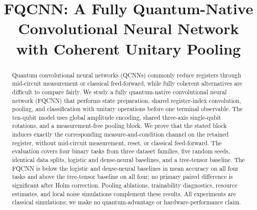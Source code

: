 \documentclass[conference]{IEEEtran}
\begin{document}
\title{FQCNN: A Fully Quantum-Native Convolutional Neural Network with Coherent Unitary Pooling}

\author{
\and
{}
\and
{}
\and
{}
}

\maketitle

\begin{abstract}
Quantum convolutional neural networks (QCNNs) commonly reduce registers through
mid-circuit measurement or classical feed-forward, while fully coherent
alternatives are difficult to compare fairly. We study a fully quantum-native
convolutional neural network (FQCNN) that performs state preparation, shared
register-index convolution, pooling, and classification with unitary operations
before one terminal observable. The ten-qubit model uses global amplitude
encoding, shared three-axis single-qubit rotations, and a measurement-free
pooling block. We prove that the stated block induces exactly the corresponding
measure-and-condition channel on the retained register, without mid-circuit
measurement, reset, or classical feed-forward. The evaluation covers four binary tasks from three dataset families, five random seeds, identical data
splits, logistic and dense-neural baselines, and a tree-tensor baseline. The
FQCNN is below the logistic and dense-neural baselines in mean accuracy on all
four tasks and above the tree-tensor baseline on all four; no primary paired
difference is significant after Holm correction. Pooling ablations, trainability diagnostics, resource estimates, and local noise simulations complement these results. All experiments are classical simulations; we make no quantum-advantage or hardware-performance claim.
\end{abstract}
\end{document}
